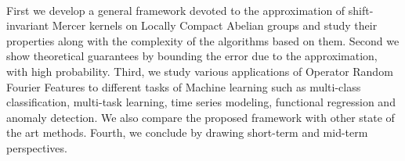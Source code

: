 \paragraph{}
First we develop a general framework devoted to the approximation of
shift-invariant Mercer kernels on Locally Compact Abelian groups and study
their properties along with the complexity of the algorithms based on them.
Second we show theoretical guarantees by bounding the error due to the
approximation, with high probability. Third, we study various applications of
Operator Random Fourier Features to different tasks of Machine learning such as
multi-class classification, multi-task learning, time series modeling,
functional regression and anomaly detection. We also compare the proposed
framework with other state of the art methods. Fourth, we conclude by drawing
short-term and mid-term perspectives.

\endgroup

\chapterend

\vfill
